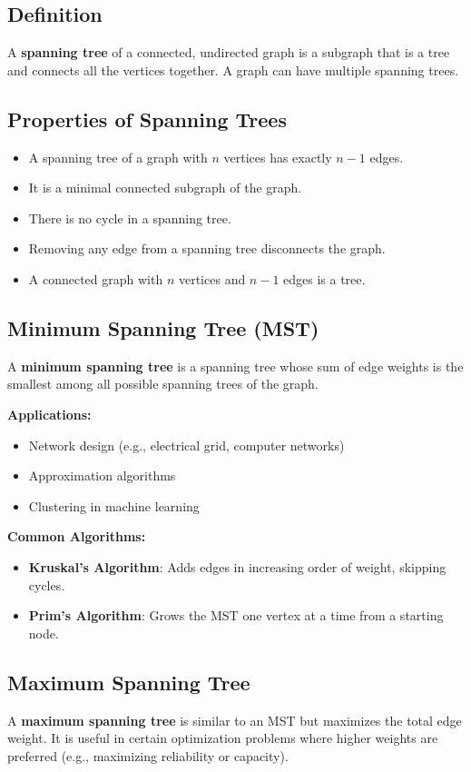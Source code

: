 \subsection{Definition}
A \textbf{spanning tree} of a connected, undirected graph is a subgraph that is a tree and connects all the vertices together. A graph can have multiple spanning trees.

\subsection{Properties of Spanning Trees}
\begin{itemize}
    \item A spanning tree of a graph with $n$ vertices has exactly $n - 1$ edges.
    \item It is a minimal connected subgraph of the graph.
    \item There is no cycle in a spanning tree.
    \item Removing any edge from a spanning tree disconnects the graph.
    \item A connected graph with $n$ vertices and $n - 1$ edges is a tree.
\end{itemize}

\subsection{Minimum Spanning Tree (MST)}
A \textbf{minimum spanning tree} is a spanning tree whose sum of edge weights is the smallest among all possible spanning trees of the graph.

\textbf{Applications:}
\begin{itemize}
    \item Network design (e.g., electrical grid, computer networks)
    \item Approximation algorithms
    \item Clustering in machine learning
\end{itemize}

\textbf{Common Algorithms:}
\begin{itemize}
    \item \textbf{Kruskal's Algorithm}: Adds edges in increasing order of weight, skipping cycles.
    \item \textbf{Prim's Algorithm}: Grows the MST one vertex at a time from a starting node.
\end{itemize}

\subsection{Maximum Spanning Tree}
A \textbf{maximum spanning tree} is similar to an MST but maximizes the total edge weight. It is useful in certain optimization problems where higher weights are preferred (e.g., maximizing reliability or capacity).

